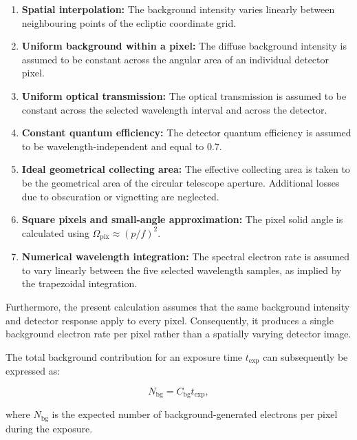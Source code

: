 \documentclass{article}
\begin{document}
\begin{enumerate}
    \item \textbf{Spatial interpolation:} The background intensity varies linearly between neighbouring points of the ecliptic coordinate grid.

    \item \textbf{Uniform background within a pixel:} The diffuse background intensity is assumed to be constant across the angular area of an individual detector pixel.

    \item \textbf{Uniform optical transmission:} The optical transmission is assumed to be constant across the selected wavelength interval and across the detector.

    \item \textbf{Constant quantum efficiency:} The detector quantum efficiency is assumed to be wavelength-independent and equal to 0.7.

    \item \textbf{Ideal geometrical collecting area:} The effective collecting area is taken to be the geometrical area of the circular telescope aperture. Additional losses due to obscuration or vignetting are neglected.

    \item \textbf{Square pixels and small-angle approximation:} The pixel solid angle is calculated using $\Omega_{\mathrm{pix}}\approx(p/f)^2$.

    \item \textbf{Numerical wavelength integration:} The spectral electron rate is assumed to vary linearly between the five selected wavelength samples, as implied by the trapezoidal integration.

\end{enumerate}

Furthermore, the present calculation assumes that the same background intensity and detector response apply to every pixel. Consequently, it produces a single background electron rate per pixel rather than a spatially varying detector image.

The total background contribution for an exposure time $t_{\mathrm{exp}}$ can subsequently be expressed as:

\begin{equation}
N_{\mathrm{bg}}
=
C_{\mathrm{bg}}t_{\mathrm{exp}},
\end{equation}

where $N_{\mathrm{bg}}$ is the expected number of background-generated electrons per pixel during the exposure.
\end{document}
